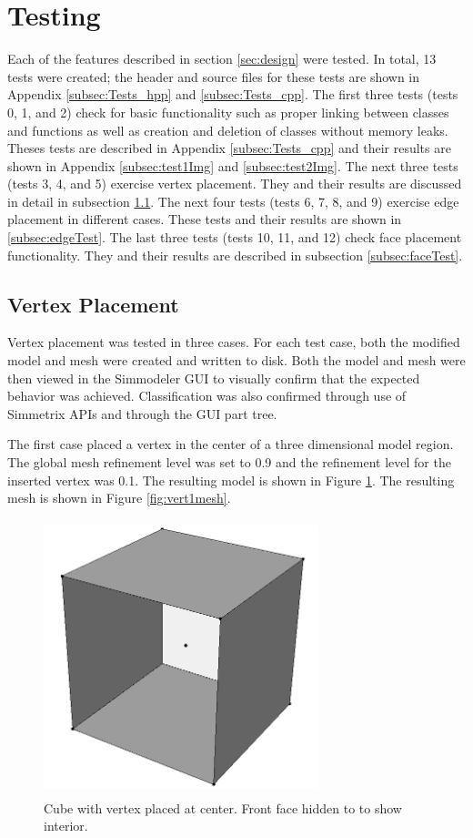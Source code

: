 \documentclass[a4paper, 12pt]{article}
\begin{document}
\section{Testing} \label{sec:testing}
Each of the features described in section \ref{sec:design} were
tested. In total, 13 tests were created; the header and
source files for these tests are shown in 
Appendix \ref{subsec:Tests_hpp} and \ref{subsec:Tests_cpp}. The first three
tests (tests 0, 1, and 2) check for basic functionality 
such as proper linking 
between classes and functions as well as creation and deletion of classes 
without memory leaks. Theses tests are described in 
Appendix \ref{subsec:Tests_cpp}
and their results are shown in Appendix \ref{subsec:test1Img} 
and \ref{subsec:test2Img}. The next three tests (tests 3, 4, and 5) 
exercise vertex placement. They and their results are discussed in detail
in subsection \ref{subsec:vertexTest}. 
The next four tests (tests 6, 7, 8, and 9)
exercise edge placement in different cases. These tests and their results 
are shown in \ref{subsec:edgeTest}. The last three 
tests (tests 10, 11, and 12)
check face placement functionality. They and their results are described in 
subsection \ref{subsec:faceTest}.

\subsection{Vertex Placement} \label{subsec:vertexTest}
Vertex placement was tested in three cases. For each test case, both
the modified model and mesh were created and written to disk. Both 
the model and mesh were then viewed in the Simmodeler GUI 
to visually confirm
that the expected behavior was achieved. Classification was also confirmed
through use of Simmetrix APIs and through the GUI part tree. 

The first case placed a vertex in the center of a three dimensional
model region. The global mesh refinement level was set to 0.9 and the 
refinement level for the inserted vertex was 0.1.
The resulting model is shown in Figure \ref{fig:vert1model}.
The resulting mesh is shown in Figure \ref{fig:vert1mesh}.

\begin{figure}[H]
  \centering
  \includegraphics[width=8cm, height=8cm]{test3_smd}
  \caption{Cube with vertex placed at center. Front face hidden to 
        to show interior.}
  \label{fig:vert1model}
\end{figure}
\end{document}
